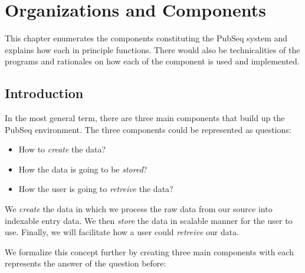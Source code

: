 
\chapter{Organizations and Components} %

\label{Chapter3} %


This chapter enumerates the components constituting the PubSeq system and explains how each in principle functions. There would also be technicalities of the programs and rationales on how each of the component is used and implemented.


\section{Introduction}

In the most general term, there are three main components that build up the PubSeq environment. The three components could be represented as questions:

\begin{itemize}
\item How to \textit{create} the data?
\item How the data is going to be \textit{stored}?
\item How the user is going to \textit{retreive} the data?
\end{itemize}

We \textit{create} the data in which we process the raw data from our source into indexable entry data. We then \textit{store} the data in scalable manner for the user to use. Finally, we will facilitate how a user could \textit{retreive} our data.

We formalize this concept further by creating three main components with each represents the answer of the question before:

